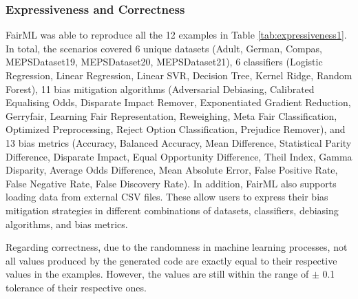 \documentclass[sigconf,review]{acmart}
\begin{document}
{	\subsubsection{Expressiveness and Correctness}
	\label{sec:expressiveness_and_correctness}
	FairML was able to reproduce all the 12 examples in Table \ref{tab:expressiveness1}.
	In total, the scenarios covered 6 unique datasets 
	(Adult, German, Compas, MEPSDataset19, MEPSDataset20, MEPSDataset21),
	6 classifiers (Logistic Regression, Linear Regression, Linear SVR, Decision Tree, Kernel Ridge, Random Forest), 
	11 bias mitigation algorithms 
	(Adversarial Debiasing, Calibrated Equalising Odds, Disparate Impact Remover, Exponentiated Gradient Reduction, Gerryfair, Learning Fair Representation, Reweighing, Meta Fair Classification, Optimized Preprocessing, Reject Option Classification, Prejudice Remover), 
	and 
	13 bias metrics 
	(Accuracy, Balanced Accuracy, Mean Difference, Statistical Parity Difference, Disparate Impact, Equal Opportunity Difference, Theil Index, Gamma Disparity, Average Odds Difference, Mean Absolute Error, False Positive Rate, False Negative Rate, False Discovery Rate). 
	In addition, FairML also supports loading data from external CSV files. 
	These allow users to express their bias mitigation strategies in different combinations of datasets, classifiers, debiasing algorithms, and bias metrics.
	
	Regarding correctness, due to the randomness in machine learning processes, not all values produced by the generated code are exactly equal to their respective values in the examples. However, the values are still within the range of $\pm$ 0.1 tolerance of their respective ones.
	
	
}
\end{document}
